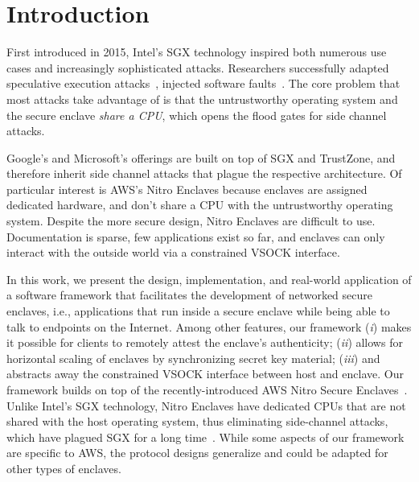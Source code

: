 \section{Introduction}

First introduced in 2015, Intel's SGX technology inspired both numerous use
cases and increasingly sophisticated attacks.  Researchers successfully adapted
speculative execution attacks~\cite{VanBulck2018a}, injected software
faults~\cite{Murdock2020a}.
The core problem that most attacks take advantage of is that the untrustworthy
operating system and the secure enclave \emph{share a CPU}, which opens the
flood gates for side channel attacks.

Google's and Microsoft's offerings are built on top of SGX and TrustZone, and
therefore inherit side channel attacks that plague the respective architecture.
Of particular interest is AWS's Nitro Enclaves because enclaves are assigned
dedicated hardware, and don't share a CPU with the untrustworthy operating
system.  Despite the more secure design, Nitro Enclaves are difficult to use.
Documentation is sparse, few applications exist so far, and enclaves can only
interact with the outside world via a constrained VSOCK interface.

In this work, we present the design, implementation, and real-world application
of a software framework that facilitates the development of networked secure
enclaves, i.e., applications that run inside a secure enclave while being able
to talk to endpoints on the Internet.  Among other features, our framework
(\emph{i}) makes it possible for clients to remotely attest the enclave's
authenticity; (\emph{ii}) allows for horizontal scaling of enclaves by
synchronizing secret key material; (\emph{iii}) and abstracts away the
constrained VSOCK interface between host and enclave.  Our framework builds on
top of the recently-introduced AWS Nitro Secure Enclaves~\cite{nitro-enclaves}.
Unlike Intel's SGX technology, Nitro Enclaves have dedicated CPUs that are not
shared with the host operating system, thus eliminating side-channel attacks,
which have plagued SGX for a long time~\cite[\S~III]{Nilsson20a}.  While some
aspects of our framework are specific to AWS, the protocol designs generalize
and could be adapted for other types of enclaves.

